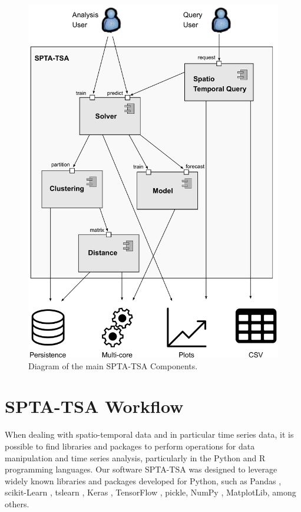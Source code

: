 \begin{figure}[h]
	\centering
	\includegraphics[scale=0.25]{../Figures/arch_spta}
	\caption{Diagram of the main SPTA-TSA Components.}
	\label{Fig:architecture_spta_tsa}
\end{figure}


\section{SPTA-TSA Workflow}
\label{Sec:SPTA-TSA_Workflow}

When dealing with spatio-temporal data and in particular time series data, it is possible to find libraries and packages to perform operations for data manipulation and time series analysis, particularly in the Python and R programming languages. Our software SPTA-TSA was designed to leverage widely known libraries and packages developed for Python, such as Pandas \cite{McKinney2010}, scikit-Learn \cite{scikit-learn2011}, tslearn \cite{tslearn2020}, Keras \cite{Chollet2015}, TensorFlow \cite{tensorflow2016}, pickle, NumPy \cite{Harris2020}, MatplotLib, among others.

